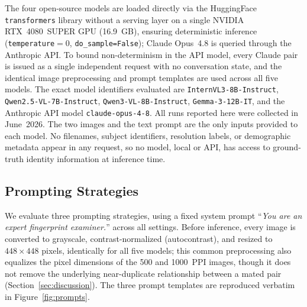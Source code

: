 \documentclass[journal]{IEEEtran}
\begin{document}
The four open-source models are loaded directly via the HuggingFace
\texttt{transformers} library without a serving layer on a single
NVIDIA RTX~4080~SUPER GPU (16.9~GB), ensuring deterministic inference
(\texttt{temperature}$=0$, \texttt{do\_sample=False}); Claude Opus~4.8 is
queried through the Anthropic API. To bound non-determinism in the API model, every Claude
pair is issued as a single independent request with no conversation
state, and the identical image preprocessing and prompt templates are
used across all five models.
The exact model identifiers evaluated are
\texttt{InternVL3-8B-Instruct}, \texttt{Qwen2.5-VL-7B-Instruct},
\texttt{Qwen3-VL-8B-Instruct}, \texttt{Gemma-3-12B-IT}, and the Anthropic
API model \texttt{claude-opus-4-8}.
All runs reported here were collected in June~2026.
The two images and the text prompt are the only inputs provided to each
model. No filenames, subject identifiers, resolution labels, or
demographic metadata appear in any request, so no model, local or API,
has access to ground-truth identity information at inference time.

\subsection{Prompting Strategies}
\label{sec:prompts}

We evaluate three prompting strategies, using a fixed system prompt
``\textit{You are an expert fingerprint examiner.}'' across all settings.
Before inference, every image is converted to grayscale, contrast-normalized
(autocontrast), and resized to $448\times448$ pixels, identically for all
five models; this common preprocessing also equalizes the pixel dimensions
of the 500 and 1000~PPI images, though it does not remove the underlying
near-duplicate relationship between a mated pair
(Section~\ref{sec:discussion}).
The three prompt templates are reproduced verbatim in
Figure~\ref{fig:prompts}.
\end{document}
